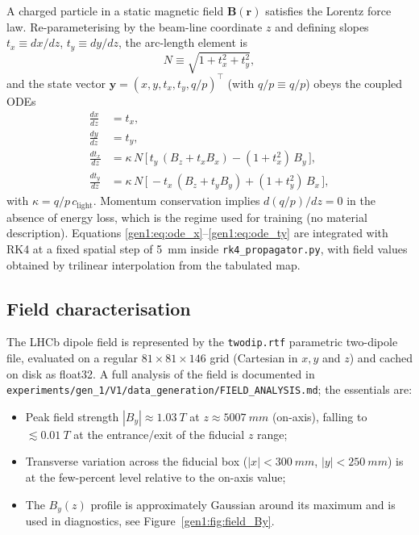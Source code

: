 \documentclass[a4paper,11pt]{article}
\newcommand{\SI}[2]{#1~#2}
\newcommand{\tesla}{T}
\newcommand{\mm}{mm}
\newcommand{\qop}{q/p}
\newcommand{\Bfield}{\mathbf{B}}
\newcommand{\state}{\mathbf{y}}
\begin{document}
A charged particle in a static magnetic field $\Bfield(\mathbf{r})$
satisfies the Lorentz force law.  Re-parameterising by the beam-line
coordinate $z$ and defining slopes $t_x \equiv dx/dz$, $t_y \equiv dy/dz$,
the arc-length element is
\begin{equation}
N \equiv \sqrt{1 + t_x^2 + t_y^2},
\label{gen1:eq:N}
\end{equation}
and the state vector $\state = (x, y, t_x, t_y, \qop)^\top$ (with
$\qop \equiv q/p$) obeys the coupled ODEs
\begin{align}
\frac{dx}{dz}  &= t_x, \label{gen1:eq:ode_x}\\
\frac{dy}{dz}  &= t_y, \label{gen1:eq:ode_y}\\
\frac{dt_x}{dz} &= \kappa\, N\, \bigl[\, t_y\,(B_z + t_x B_x) - (1 + t_x^2)\, B_y \,\bigr],
  \label{gen1:eq:ode_tx}\\
\frac{dt_y}{dz} &= \kappa\, N\, \bigl[\, -t_x\,(B_z + t_y B_y) + (1 + t_y^2)\, B_x \,\bigr],
  \label{gen1:eq:ode_ty}
\end{align}
with $\kappa = \qop\, c_{\text{light}}$.  Momentum conservation implies
$d(\qop)/dz = 0$ in the absence of energy loss, which is the regime used
for training (no material description).  Equations
\eqref{gen1:eq:ode_x}--\eqref{gen1:eq:ode_ty} are integrated with RK4 at a
fixed spatial step of \SI{5}{\mm} inside \texttt{rk4\_propagator.py}, with
field values obtained by trilinear interpolation from the tabulated map.

\subsection{Field characterisation}

The LHCb dipole field is represented by the \texttt{twodip.rtf}
parametric two-dipole file, evaluated on a regular
$81\times81\times146$ grid (Cartesian in $x,y$ and $z$) and cached on
disk as float32.  A full analysis of the field is documented in
\texttt{experiments/gen\_1/V1/data\_generation/FIELD\_ANALYSIS.md}; the
essentials are:

\begin{itemize}\setlength{\itemsep}{1pt}
\item Peak field strength $|B_y| \approx \SI{1.03}{\tesla}$ at
  $z \approx \SI{5007}{\mm}$ (on-axis), falling to $\lesssim
  \SI{0.01}{\tesla}$ at the entrance/exit of the fiducial $z$ range;
\item Transverse variation across the fiducial box ($|x|<\SI{300}{\mm}$,
  $|y|<\SI{250}{\mm}$) is at the few-percent level relative to the on-axis
  value;
\item The $B_y(z)$ profile is approximately Gaussian around its
  maximum and is used in diagnostics, see Figure~\ref{gen1:fig:field_By}.
\end{itemize}
\end{document}
